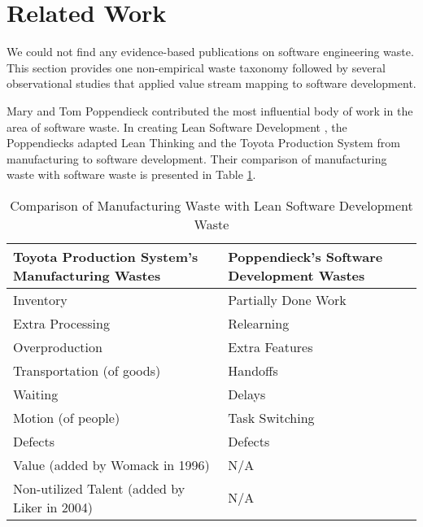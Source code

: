 \section{Related Work}
We could not find any evidence-based publications on software engineering waste. This section provides one non-empirical waste taxonomy followed by several observational studies that applied value stream mapping to software development.

Mary and Tom Poppendieck contributed the most influential body of work in the area of software waste. In creating Lean Software Development \cite{PoppendieckLeanSoftwareDevelopment}, the Poppendiecks adapted Lean Thinking and the Toyota Production System from manufacturing to software development. Their comparison of manufacturing waste with software waste is presented in Table \ref{ManufacturingVersusLeanSoftwareWaste}.
 
\begin{table}[t]
\renewcommand{\arraystretch}{1.5}
\centering
\caption{Comparison of Manufacturing Waste with Lean Software Development Waste}
\label{ManufacturingVersusLeanSoftwareWaste}
\begin{tabular}{|p{1.57in}|p{1.57in}|}
\hline
Toyota Production System's Manufacturing Wastes & Poppendieck's Software Development Wastes \\ \hline
Inventory                                       & Partially Done Work                       \\ \hline
Extra Processing                                & Relearning                                \\ \hline
Overproduction                                  & Extra Features                            \\ \hline
Transportation (of goods)                       & Handoffs                                  \\ \hline
Waiting                                         & Delays                                    \\ \hline
Motion (of people)                              & Task Switching                            \\ \hline
Defects                                         & Defects                                   \\ \hline
Value (added by Womack in 1996)                 & N/A                                       \\ \hline
Non-utilized Talent (added by Liker in 2004)     & N/A                                       \\ \hline
\end{tabular}
\end{table}

